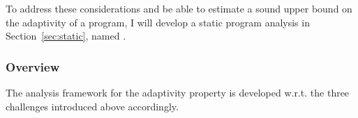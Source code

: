 \begin{enumerate}
To address these considerations and be able to estimate a sound upper bound on the adaptivity of a program, 
I will develop a static program analysis in Section~\ref{sec:static}, named {\THESYSTEM}.
\end{enumerate}%


\subsubsection{Overview}
\label{subsec:intro-adapt}
The analysis framework for the adaptivity property is 
developed w.r.t. the three challenges introduced above accordingly.

